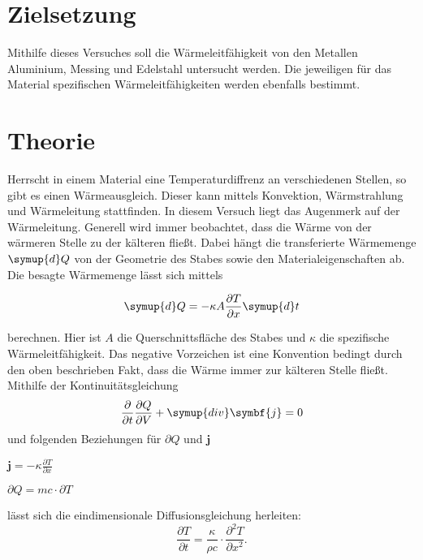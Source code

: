 \section{Zielsetzung}
Mithilfe dieses Versuches soll die Wärmeleitfähigkeit von den Metallen Aluminium, Messing und Edelstahl untersucht werden.
Die jeweiligen für das Material spezifischen Wärmeleitfähigkeiten werden ebenfalls bestimmt.


\section{Theorie}
\label{sec:Theorie}

Herrscht in einem Material eine Temperaturdiffrenz an verschiedenen Stellen, so gibt es einen Wärmeausgleich.
Dieser kann mittels Konvektion, Wärmstrahlung und Wärmeleitung stattfinden. In diesem Versuch liegt das Augenmerk auf der Wärmeleitung.
Generell wird immer beobachtet, dass die Wärme von der wärmeren Stelle zu der kälteren fließt.
Dabei hängt die transferierte Wärmemenge $\symup{d}Q$ von der Geometrie des Stabes sowie den Materialeigenschaften ab. Die besagte Wärmemenge lässt sich mittels

\begin{equation}
\label{eqn:waermemenge}
    \symup{d}Q = -\kappa A \frac{\partial T}{\partial x}\symup{d}t
\end{equation}

berechnen. Hier ist $A$ die Querschnittsfläche des Stabes und $\kappa$ die spezifische Wärmeleitfähigkeit. Das negative Vorzeichen ist eine Konvention bedingt durch den oben beschrieben Fakt, dass die Wärme immer zur kälteren Stelle fließt.
Mithilfe der Kontinuitätsgleichung 
\begin{equation}
\label{eqn:kontinuitaet}
    \frac{\partial}{\partial t}\frac{\partial Q}{\partial V} + \symup{div} \symbf{j} = 0
\end{equation}
und folgenden Beziehungen für $\partial Q$ und $\symbf{j}$

\centerline{$\symbf{j} = - \kappa \frac{\partial T}{\partial x}$}

\centerline{$\partial Q = mc \cdot \partial T$}

lässt sich die eindimensionale Diffusionsgleichung herleiten:
\begin{equation}
\label{eqn:diffusion}
    \frac{\partial T}{\partial t} = \frac{\kappa}{\rho c} \cdot \frac{\partial^2 T}{\partial x^2}    .
\end{equation}

